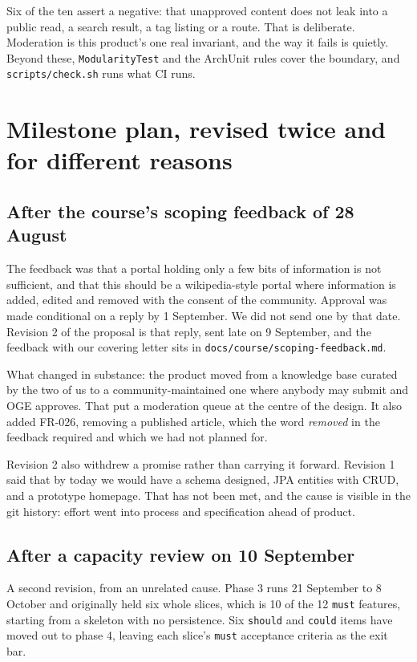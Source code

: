 \documentclass[11pt]{article}
\begin{document}
\vspace{0.6em}
\noindent Six of the ten assert a negative: that unapproved content does not leak into a public read,
a search result, a tag listing or a route. That is deliberate. Moderation is this product's one real
invariant, and the way it fails is quietly. Beyond these, \texttt{ModularityTest} and the ArchUnit
rules cover the boundary, and \texttt{scripts/check.sh} runs what CI runs.

\section{Milestone plan, revised twice and for different reasons}

\subsection{After the course's scoping feedback of 28 August}

The feedback was that a portal holding only a few bits of information is not sufficient, and that
this should be a wikipedia-style portal where information is added, edited and removed with the
consent of the community. Approval was made conditional on a reply by 1 September. We did not send
one by that date. Revision 2 of the proposal is that reply, sent late on 9 September, and the
feedback with our covering letter sits in \texttt{docs/course/scoping-feedback.md}.

What changed in substance: the product moved from a knowledge base curated by the two of us to a
community-maintained one where anybody may submit and OGE approves. That put a moderation queue at
the centre of the design. It also added FR-026, removing a published article, which the word
\emph{removed} in the feedback required and which we had not planned for.

Revision 2 also withdrew a promise rather than carrying it forward. Revision 1 said that by today we
would have a schema designed, JPA entities with CRUD, and a prototype homepage. That has not been
met, and the cause is visible in the git history: effort went into process and specification ahead of
product.

\subsection{After a capacity review on 10 September}

A second revision, from an unrelated cause. Phase 3 runs 21 September to 8 October and originally
held six whole slices, which is 10 of the 12 \texttt{must} features, starting from a skeleton with no
persistence. Six \texttt{should} and \texttt{could} items have moved out to phase 4, leaving each
slice's \texttt{must} acceptance criteria as the exit bar.
\end{document}
